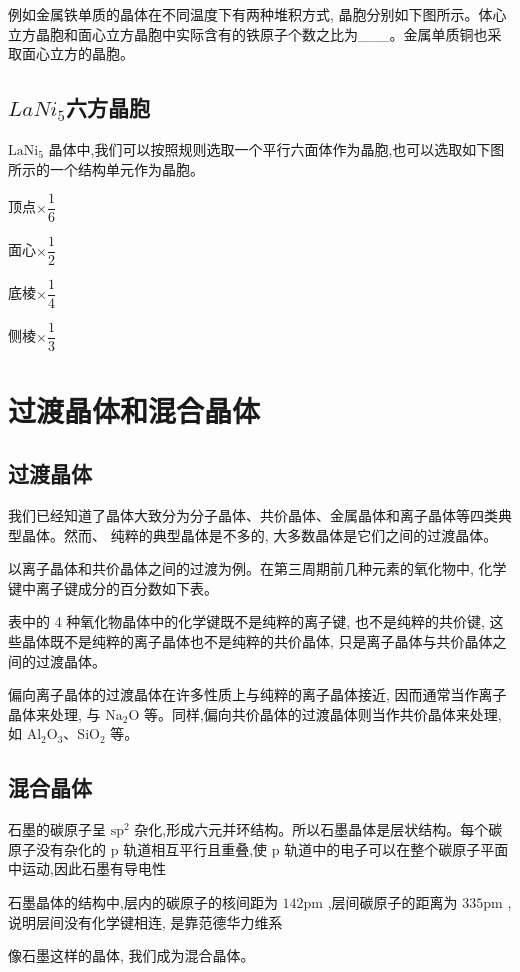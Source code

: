 \documentclass[10pt,cn]{elegantbook}
\begin{document}
例如金属铁单质的晶体在不同温度下有两种堆积方式, 晶胞分别如下图所示。体心立方晶胞和面心立方晶胞中实际含有的铁原子个数之比为\_\_\_。金属单质铜也采取面心立方的晶胞。

\subsection{$LaNi_{5}$六方晶胞}

\({\mathrm{{LaNi}}}_{5}\) 晶体中,我们可以按照规则选取一个平行六面体作为晶胞,也可以选取如下图所示的一个结构单元作为晶胞。

顶点$\times \dfrac{1}{6}$

面心$\times \dfrac{1}{2}$

底棱$\times \dfrac{1}{4}$

侧棱$\times \dfrac{1}{3}$


\section{过渡晶体和混合晶体}

\subsection{ 过渡晶体}

我们已经知道了晶体大致分为分子晶体、共价晶体、金属晶体和离子晶体等四类典型晶体。然而、 纯粹的典型晶体是不多的, 大多数晶体是它们之间的过渡晶体。

以离子晶体和共价晶体之间的过渡为例。在第三周期前几种元素的氧化物中, 化学键中离子键成分的百分数如下表。

\begin{center}
\end{center}

表中的 4 种氧化物晶体中的化学键既不是纯粹的离子键, 也不是纯粹的共价键, 这些晶体既不是纯粹的离子晶体也不是纯粹的共价晶体, 只是离子晶体与共价晶体之间的过渡晶体。

偏向离子晶体的过渡晶体在许多性质上与纯粹的离子晶体接近, 因而通常当作离子晶体来处理, 与 \({\mathrm{{Na}}}_{2}\mathrm{O}\) 等。同样,偏向共价晶体的过渡晶体则当作共价晶体来处理,如 \({\mathrm{{Al}}}_{2}{\mathrm{O}}_{3}\text{、}{\mathrm{{SiO}}}_{2}\) 等。

\subsection{ 混合晶体}

石墨的碳原子呈 \({\mathrm{{sp}}}^{2}\) 杂化,形成六元并环结构。所以石墨晶体是层状结构。每个碳原子没有杂化的 \(\mathrm{p}\) 轨道相互平行且重叠,使 \(\mathrm{p}\) 轨道中的电子可以在整个碳原子平面中运动,因此石墨有导电性

石墨晶体的结构中,层内的碳原子的核间距为 \( {142}\mathrm{{pm}} \) ,层间碳原子的距离为 \( {335}\mathrm{{pm}} \) ,说明层间没有化学键相连, 是靠范德华力维系

像石墨这样的晶体, 我们成为混合晶体。
\end{document}
